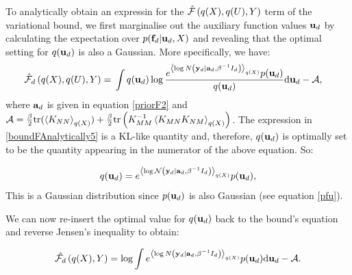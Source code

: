 
To analytically obtain an expressin for the $\hat{\mathcal{F}} \left( q(X), q(U), Y \right)$ term of the variational bound, we first
marginalise out the auxiliary function values $\mathbf{u}_d$ by calculating the
expectation over $p(\mathbf{f}_d | \mathbf{u}_d,X)$ and revealing that the optimal setting for $q(\mathbf{u}_d)$ is 
also a Gaussian. More specifically, we have:
\begin{align}
\hat{\mathcal{F}}_d \left( q(X), q(U), Y \right)={}& \int q(\mathbf{u}_d) \log \frac{e^{\left\langle \log N \left( \mathbf{y}_d | \mathbf{a}_d, \beta^{-1} I_d \right) \right\rangle_{q(X)}}
		p(\mathbf{u}_d)}{q(\mathbf{u}_d)} \text{d} \mathbf{u}_d - \mathcal{A} , \label{boundFAnalytically5}
\end{align}
where $\mathbf{a}_d$ is given in equation \eqref{priorF2} and 
$\mathcal{A}=\frac{\beta}{2} \text{tr}(\left\langle K_{NN} \right\rangle_{q(X)}) +
	 	\frac{\beta}{2} \text{tr} \left(K_{MM}^{-1} \left\langle K_{MN} K_{NM} \right\rangle_{q(X)} \right) $.
The expression in \eqref{boundFAnalytically5} is a KL-like quantity and, therefore, $q(\mathbf{u}_d)$ is optimally set to be the quantity 
appearing in the numerator of the above equation. So:

\begin{equation}
\label{qu}
q(\mathbf{u}_d) = e^{\left\langle \log \mathcal{N} \left( \mathbf{y}_d | \mathbf{a}_d, \beta^{-1} I_d \right) \right\rangle_{q(X)}}
		p(\mathbf{u}_d) ,
\end{equation}
This is a Gaussian distribution since 
$p(\mathbf{u}_d )$ is also Gaussian (see equation \eqref{pfu}).

\par We can now re-insert the optimal value for $q(\mathbf{u}_d)$ back to the bound's equation and reverse Jensen's inequality to obtain:

\begin{equation}
\label{boundFAnalyticallyFinalIntegral}
\hat{\mathcal{F}_d} \left( q(X), Y \right) = 
	\log \int e^{\left\langle \log N \left( \mathbf{y}_d | \mathbf{a}_d, \beta^{-1} I_d \right) \right\rangle_{q(X)}}
		p(\mathbf{u}_d) \text{d} \mathbf{u}_d -\mathcal{A} .
\end{equation}

